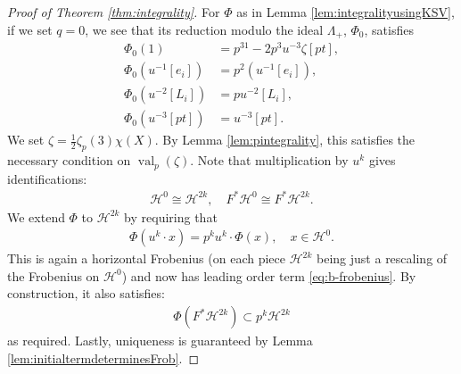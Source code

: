 \documentclass[10pt,a4paper]{amsart}
\newcommand{\calH}{\mathcal{H}}
\begin{document}
\begin{proof}[Proof of Theorem \ref{thm:integrality}]
     For $\Phi$ as in Lemma \ref{lem:integralityusingKSV}, if we set $q=0$, we see that its reduction modulo the ideal $\Lambda_{+}$, $\Phi_0 $, satisfies
    \begin{equation}
        \begin{aligned}
            \Phi_0(1) &= p^31 -2p^3u^{-3}\zeta[pt], \\
            \Phi_0(u^{-1}[e_i]) &= p^2(u^{-1}[e_i]), \\
            \Phi_0(u^{-2}[L_i]) &= pu^{-2}[L_i], \\
            \Phi_0(u^{-3}[pt]) &= u^{-3}[pt].
        \end{aligned}
    \end{equation}
    We set $\zeta = \frac12 \zeta_p(3)\chi(X)$. By Lemma \ref{lem:pintegrality}, this satisfies the necessary condition on $\operatorname{val}_p(\zeta)$. Note that multiplication by $u^k$ gives identifications: \begin{align}\calH^{0} \cong \calH^{2k},\quad F^*\calH^{0} \cong F^*\calH^{2k}.
    \end{align} 
   We extend $\Phi$ to $\calH^{2k}$ by requiring that \begin{align} \Phi(u^k\cdot x)=p^ku^k \cdot \Phi(x),\quad x \in \calH^{0}. \end{align}
   This is again a horizontal Frobenius (on each piece $\calH^{2k}$ being just a rescaling of the Frobenius on $\calH^{0}$) and now has leading order term  \eqref{eq:b-frobenius}. By construction, it also satisfies: \begin{align} \Phi(F^*\calH^{2k}) \subset p^k \calH^{2k} \end{align} as required. Lastly, uniqueness is guaranteed by Lemma \ref{lem:initialtermdeterminesFrob}.
\end{proof}
\end{document}
